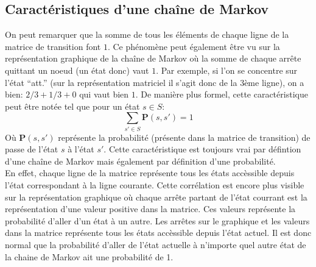 \documentclass[letterpaper]{article}
\begin{document}
    
    
    
    
  \subsection{Caractéristiques d'une chaîne de Markov}
    On peut remarquer que la somme de tous les éléments de chaque ligne de la
    matrice de transition font $1$.  Ce phénomène peut également être vu
    sur la représentation graphique de la chaîne de Markov où la somme de chaque
    arrête quittant un noeud (un état donc) vaut $1$.  Par exemple, si l'on se
    concentre sur l'état ``att.'' (sur la représentation matriciel il s'agit donc 
    de la 3ème ligne), on a bien: $2/3 + 1/3 + 0$ qui vaut bien $1$.  De manière 
    plus formel, cette caractéristique peut être notée tel que pour un état $s \in S$:
    $$\sum\limits_{s' \in S} \mathbf{P}(s, s') = 1$$
    Où $\mathbf{P}(s, s')$ représente la probabilité (présente dans la matrice de
    transition) de passe de l'état $s$ à l'état $s'$.  Cette caractéristique est
    toujours vrai par défintion d'une chaîne de Markov mais également par définition
    d'une probabilité.\\
    En effet, chaque ligne de la matrice représente tous les états accèssible depuis
    l'état correspondant à la ligne courante.  Cette corrélation est encore plus
    visible sur la représentation graphique où chaque arrête partant de l'état courrant
    est la représentation d'une valeur positive dans la matrice.  Ces valeurs 
    représente la probabilité d'aller d'un état à un autre.  Les arrêtes sur le
    graphique et les valeurs dans la matrice représente tous les états accèssible
    depuis l'état actuel.  Il est donc normal que la probabilité d'aller de l'état
    actuelle à n'importe quel autre état de la chaine de Markov ait une probabilité de 1.
    
\end{document}
